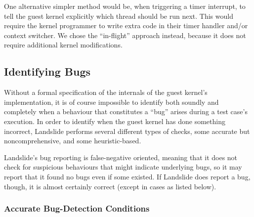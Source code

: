 One alternative simpler method would be, when triggering a timer interrupt, to tell the guest kernel explicitly which thread should be run next. This would require the kernel programmer to write extra code in their timer handler and/or context switcher. We chose the ``in-flight'' approach instead, because it does not require additional kernel modifications.

\subsection{Identifying Bugs}
\label{sec:techniques-bugs}

Without a formal specification of the internals of the guest kernel's implementation\cite{sel4}, it is of course impossible to identify both soundly and completely when a behaviour that constitutes a ``bug'' arises during a test case's execution.
In order to identify when the guest kernel has done something incorrect, Landslide performs several different types of checks, some accurate but noncomprehensive, and some heuristic-based.

Landslide's bug reporting is false-negative oriented, meaning that it does not check for suspicious behaviours that might indicate underlying bugs, so it may report that it found no bugs even if some existed. If Landslide does report a bug, though, it is almost certainly correct (except in cases as listed below).

\subsubsection{Accurate Bug-Detection Conditions}

